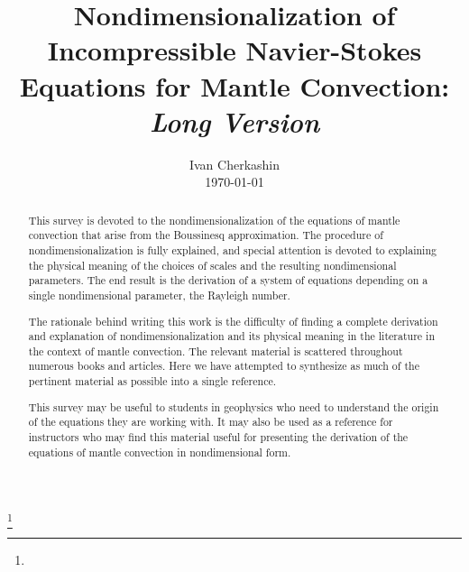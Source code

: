 \documentclass[oneside]{amsbook}
\theoremstyle{definition}
\theoremstyle{remark}
\numberwithin{section}{chapter}
\numberwithin{equation}{chapter}
\begin{document}
\frontmatter

\title{Nondimensionalization of Incompressible Navier-Stokes Equations for Mantle Convection: \\ \textit{Long Version}} 


\author{Ivan Cherkashin \\ \today}
\curraddr{}

\address{}
\curraddr{}
\thanks{}




\begin{abstract}

This survey is devoted to the nondimensionalization of the equations of mantle convection that arise from the Boussinesq approximation. The procedure of nondimensionalization is fully explained, and special attention is devoted to explaining the physical meaning of the choices of scales and the resulting nondimensional parameters. The end result is the derivation of a system of equations depending on a single nondimensional parameter, the Rayleigh number.

The rationale behind writing this work is the difficulty of finding a complete derivation and explanation of nondimensionalization and its physical meaning in the literature in the context of mantle convection. The relevant material is scattered throughout numerous books and articles. Here we have attempted to synthesize as much of the pertinent material as possible into a single reference.

This survey may be useful to students in geophysics who need to understand the origin of the equations they are working with. It may also be used as a reference for instructors who may find this material useful for presenting the derivation of the equations of mantle convection in nondimensional form.   

\end{abstract}

\maketitle
\end{document}
